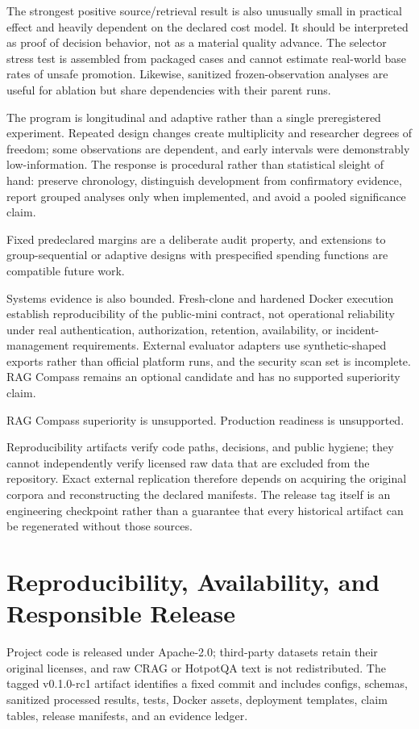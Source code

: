 \documentclass[11pt]{article}
\begin{document}
The strongest positive source/retrieval result is also unusually small in practical effect and heavily dependent on the declared cost model. It should be interpreted as proof of decision behavior, not as a material quality advance. The selector stress test is assembled from packaged cases and cannot estimate real-world base rates of unsafe promotion. Likewise, sanitized frozen-observation analyses are useful for ablation but share dependencies with their parent runs.

The program is longitudinal and adaptive rather than a single preregistered experiment. Repeated design changes create multiplicity and researcher degrees of freedom; some observations are dependent, and early intervals were demonstrably low-information. The response is procedural rather than statistical sleight of hand: preserve chronology, distinguish development from confirmatory evidence, report grouped analyses only when implemented, and avoid a pooled significance claim.

Fixed predeclared margins are a deliberate audit property, and extensions to group-sequential or adaptive designs with prespecified spending functions are compatible future work.

Systems evidence is also bounded. Fresh-clone and hardened Docker execution establish reproducibility of the public-mini contract, not operational reliability under real authentication, authorization, retention, availability, or incident-management requirements. External evaluator adapters use synthetic-shaped exports rather than official platform runs, and the security scan set is incomplete. RAG Compass remains an optional candidate and has no supported superiority claim.

RAG Compass superiority is unsupported. Production readiness is unsupported.

Reproducibility artifacts verify code paths, decisions, and public hygiene; they cannot independently verify licensed raw data that are excluded from the repository. Exact external replication therefore depends on acquiring the original corpora and reconstructing the declared manifests. The release tag itself is an engineering checkpoint rather than a guarantee that every historical artifact can be regenerated without those sources.

\section{Reproducibility, Availability, and Responsible Release}
Project code is released under Apache-2.0; third-party datasets retain their original licenses, and raw CRAG or HotpotQA text is not redistributed. The tagged v0.1.0-rc1 artifact identifies a fixed commit and includes configs, schemas, sanitized processed results, tests, Docker assets, deployment templates, claim tables, release manifests, and an evidence ledger.
\end{document}
